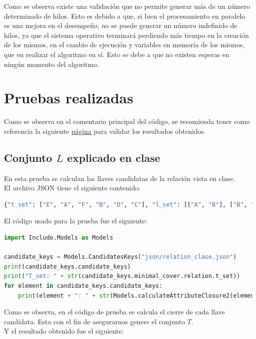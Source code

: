 \documentclass[a4paper,12pt]{article}
\begin{document}
{\begin{lstlisting}[language=python, caption={Algoritmo que calcula las llaves candidatas.\\\hspace{\textwidth}}, captionpos=t]
\end{lstlisting}

Como se observa existe una validación que no permite generar más de un número determinado de hilos. Esto es debido a que, si bien el procesamiento en paralelo es una mejora en el desempeño, no se puede generar un número indefinido de hilos, ya que el sistema operativo terminará perdiendo más tiempo en la creación de los mismos, en el cambio de ejecución y variables en memoria de los mismos, que en realizar el algoritmo en sí. Esto se debe a que no existen esperas en ningún momento del algoritmo.

\section{Pruebas realizadas}

Como se observa en el comentario principal del código, se recomienda tener como referencia la siguiente \href{http://raymondcho.net/RelationalDatabaseTools/RelationalDatabaseTools}{\underline{página}} para validar los resultados obtenidos.

\subsection{Conjunto $L$ explicado en clase}
En esta prueba se calculan las llaves candidatas de la relación vista en clase.
\\
El archivo JSON tiene el siguiente contenido:

\begin{lstlisting}[language=python, caption={Archivo JSON visto en clase.\\\hspace{\textwidth}}, captionpos=t]
{"t_set": ["E", "A", "F", "B", "D", "C"], "l_set": [["A", "B"], ["B", "C"], ["B", "D"], ["C", "A"], ["A", "D"], ["AC", "E"], ["FB", "D"]]}
\end{lstlisting}

El código usado para la prueba fue el siguiente:

\begin{lstlisting}[language=python, caption={Prueba con la relación de clase.\\\hspace{\textwidth}}, captionpos=t]
import Include.Models as Models

candidate_keys = Models.CandidatesKeys("json/relation_clase.json")
print(candidate_keys.candidate_keys)
print("T_set: " + str(candidate_keys.minimal_cover.relation.t_set))
for element in candidate_keys.candidate_keys:
    print(element + ": " + str(Models.calculateAttributeClosure2(element,candidate_keys.minimal_cover.irreducible_rel.l_set)))
\end{lstlisting}
Como se observa, en el código de prueba se calcula el cierre de cada llave candidata. Esto con el fin de asegurarnos genere el conjunto $T$.
\\
Y el resultado obtenido fue el siguiente:

}
\end{document}
